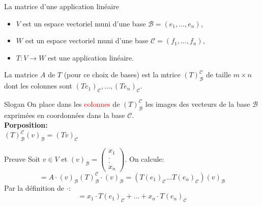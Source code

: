 

\begin{parag}{La matrice d'une application linéaire}
    \begin{itemize}
        \item $V$ est un espace vectoriel muni d'une base $\mathcal{B} = \left(e_1, \dots, e_n \right)$,
        \item $W$ est un espace vectoriel muni d'une base $\mathcal{C} = \left(f_1, \dots, f_n\right)$,
        \item $T : V \to W$ est une application linéaire.
    \end{itemize}


    \begin{definition}
        La matrice $A$ de $T$ (pour ce choix de bases) est la mtrice $\left(T\right)_{\mathcal{B}}^{\mathcal{C}}$ de taille $m \times n$ dont les colonnes sont $\left(Te_1\right)_{\mathcal{C}}, \dots, \left(Te_n\right)_{\mathcal{C}}$.
    \end{definition}
    \begin{subparag}{Slogan}
        On place dans les \textcolor{red}{colonnes} de $\left(T\right)_{\mathcal{B}}^{\mathcal{C}}$ les images des vecteurs de la base $\mathcal{B}$ exprimées en coordonnées dans la base $\mathcal{C}$.
        \\
        \textbf{Porposition:} \\
        $\left(T\right)_{\mathcal{B}}^{\mathcal{C}}\left(v\right)_{\mathcal{B}} = \left(Tv\right)_{\mathcal{C}}$
    \end{subparag}
    \begin{subparag}{Preuve}
        Soit $v \in V$ et $\left(v\right)_{\mathcal{B}} = \begin{pmatrix}
            x_1 \\ . \\ . \\ x_n
        \end{pmatrix}$. On calcule:
        \[ = A \cdot \left(v\right)_{\mathcal{B}} \left(T\right)_{\mathcal{B}}^{\mathcal{C}}\cdot\left(v\right)_{\mathcal{B}} = \left(T\left(e_1\right)_{\mathcal{C}} \dots T\left(e_n\right)_{\mathcal{C}}\right)\left(v\right)_{\mathcal{B}}\]
        Par la définition de $\cdot$:
        \[= x_1 \cdot T\left(e_1\right)_{\mathcal{C}} + \dots + x_n \cdot T\left(e_n\right)_{\mathcal{C}}\]


\end{subparag}
\end{parag}
